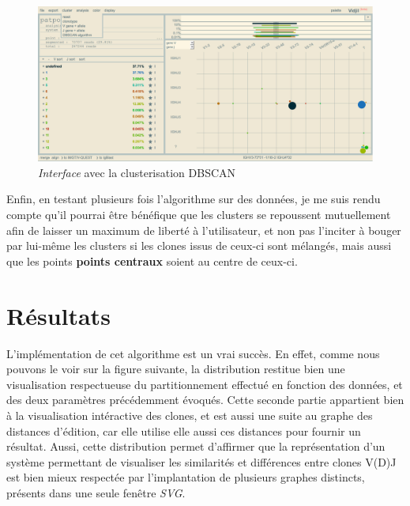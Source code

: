 \documentclass[pdftex,12pt,a4paper]{report}
\begin{document}
\begin{spacing}{1.2}
\begin{figure}[H]
\begin{center}
	\includegraphics[scale=0.35]{img/DBSCAN-Cluster-Ex.jpg}
\end{center}
\caption{\textit{Interface} avec la clusterisation DBSCAN}
\end{figure}

Enfin, en testant plusieurs fois l'algorithme sur des données, je me suis rendu compte qu'il pourrai être bénéfique que les clusters se repoussent mutuellement afin de laisser un maximum de liberté à l'utilisateur, et non pas l'inciter à bouger par lui-même les clusters si les clones issus de ceux-ci sont mélangés, mais aussi que les points \textbf{points centraux} soient au centre de ceux-ci.

\section{Résultats}

L'implémentation de cet algorithme est un vrai succès. En effet, comme nous pouvons le voir sur la figure suivante, la distribution restitue bien une visualisation respectueuse du partitionnement effectué en fonction des données, et des deux paramètres précédemment évoqués.
Cette seconde partie appartient bien à la visualisation intéractive des clones, et est aussi une suite au graphe des distances d'édition, car elle utilise elle aussi ces distances pour fournir un résultat.
Aussi, cette distribution permet d'affirmer que la représentation d'un système permettant de visualiser les similarités et différences entre clones V(D)J est bien mieux respectée par l'implantation de plusieurs graphes distincts, présents dans une seule fenêtre \textit{SVG}.


\end{spacing}
\end{document}
